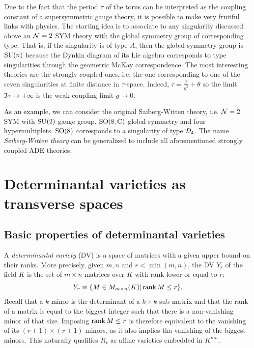         Due to the fact that the period $\tau$ of the torus can be interpreted as the coupling constant of a supersymmetric gauge theory, it is possible to make very fruitful links with physics. The starting idea is to associate to any singularity discussed above an $\mathcal{N}=2$ SYM theory with the global symmetry group of corresponding type. That is, if the singularity is of type $A$, then the global symmetry group is $\text{SU}(n)$ because the Dynkin diagram of its Lie algebra corresponds to type singularities through the geometric McKay correspondence. The most interesting theories are the strongly coupled ones, i.e. the one corresponding to one of the seven singularities at finite distance in $\tau$-space. Indeed, $\tau=\frac{i}{g^2}+\theta$ so the limit $\Im\tau\to+\infty$ is the weak coupling limit $g\to0$.

        As an example, we can consider the original Saiberg-Witten theory, i.e. $\mathcal{N}=2$ SYM with $\text{SU}(2)$ gauge group, $\text{SO}(8,\mathbb{C})$ global symmetry and four hypermultiplets. $\text{SO}(8)$ corresponds to a singularity of type $\mathcal{D}_4$. The name \emph{Seiberg-Witten theory} can be generalized to include all aforementioned strongly coupled ADE theories.

        

\section{Determinantal varieties as transverse spaces}

    \subsection{Basic properties of determinantal varieties}  

            A \emph{determinantal variety} (DV) is a space of matrices with a given upper bound on their ranks. More precisely, given $m,n$ and $r<\min(m,n)$, the DV $Y_r$ of the field $K$ is the set of $m\times n$ matrices over $K$ with rank lower or equal to $r$:
            \begin{equation}
                Y_r\equiv\{M\in M_{m\times n}(K)|\rank M\leq r\}.
            \end{equation}
            Recall that a $k$-minor is the determinant of a $k\times k$ sub-matrix and that the rank of a matrix is equal to the biggest integer such that there is a non-vanishing minor of that size. Imposing $\rank M\leq r$ is therefore equivalent to the vanishing of its $(r+1)\times (r+1)$ minors, as it also implies tha vanishing of the biggest minors. This naturally qualifies $R_r$ as affine varieties embedded in $K^{mn}$. 
            
